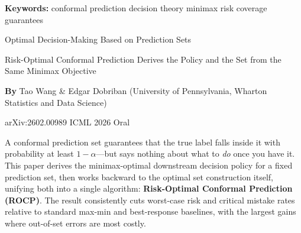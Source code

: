 \documentclass[10pt,twocolumn]{article}
\begin{document}
\setlength{\parindent}{0pt}
\setlength{\parskip}{4pt}

{\small\color{keywordgray}\textbf{Keywords:}
  conformal prediction \textbullet{}
  decision theory \textbullet{}
  minimax risk \textbullet{}
  coverage guarantees}\par\vspace{4pt}

{\LARGE\bfseries\raggedright
  Optimal Decision-Making Based on Prediction Sets}\par\vspace{4pt}

{\large\itshape\raggedright
  Risk-Optimal Conformal Prediction Derives the Policy and the Set
  from the Same Minimax Objective}\par\vspace{6pt}

{\small\textbf{By} Tao Wang \& Edgar Dobriban
  (University of Pennsylvania, Wharton Statistics and Data Science)}\par\vspace{2pt}

{\small\color{keywordgray}arXiv:2602.00989 \textbullet{}
  ICML 2026 Oral}
\par\vspace{2pt}\noindent{\color{rulered}\rule{\columnwidth}{0.6pt}}\vspace{6pt}

A conformal prediction set guarantees that the true label falls inside it
with probability at least $1-\alpha$---but says nothing about what to
\emph{do} once you have it. This paper derives the minimax-optimal
downstream decision policy for a fixed prediction set, then works backward
to the optimal set construction itself, unifying both into a single
algorithm: \textbf{Risk-Optimal Conformal Prediction (ROCP)}. The result
consistently cuts worst-case risk and critical mistake rates relative to
standard max-min and best-response baselines, with the largest gains where
out-of-set errors are most costly.
\end{document}
